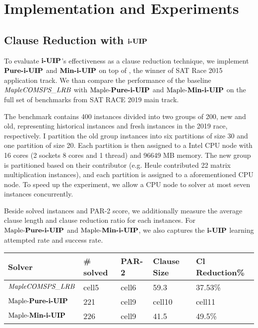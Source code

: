 \section{Implementation and Experiments}

\subsection{Clause Reduction with $\textbf{i-UIP}$}
To evaluate $\textbf{i-UIP}$'s effectiveness as a clause reduction technique, we implement  $\textbf{Pure-i-UIP}$ and $\textbf{Min-i-UIP}$  on top of \text{\MapleBase} \cite{}, the winner of SAT Race 2015 application track.  We than compare the performance of the baseline $\textit{MapleCOMSPS\_LRB}$ with $\text{Maple-\textbf{Pure-i-UIP}}$ and $\text{Maple-\textbf{Min-i-UIP}}$ on the full set of benchmarks from SAT RACE 2019 main track.

The benchmark contains 400 instances divided into two groups of 200, new and old, representing historical instances and fresh instances in the 2019 race, respectively. I partition the old group instances into six partitions of size 30 and one partition of size 20. Each partition is then assigned to a Intel CPU node with 16 cores (2 sockets 8 cores  and  1 thread) and 96649 MB memory. The new group is partitioned based on their contributor (e.g. Heule contributed 22 matrix multiplication instances), and each partition is assigned to a aforementioned CPU node. To speed up the experiment, we allow a CPU node to solver at most seven instances concurrently. 

Beside solved instances and PAR-2 score, we additionally measure the average clause length and clause reduction ratio for each instances. For $\text{Maple-\textbf{Pure-i-UIP}}$  and $\text{Maple-\textbf{Min-i-UIP}}$, we also captures the $\textbf{i-UIP}$ learning attempted rate and success rate.





\begin{center}
\begin{tabular}{ | m{3.5cm} | m{2cm}| m{2cm} | m{2cm} | m{2.5cm} | } 
\hline
Solver & \# solved & PAR-2 & Clause Size & Cl Reduction\% \\ 
\hline
$\textit{MapleCOMSPS\_LRB}$ & cell5 & cell6 & 59.3 & 37.53\% \\ 
\hline
$\text{Maple-\textbf{Pure-i-UIP}}$ & 221 & cell9 & cell10 & cell11\\ 
\hline
$\text{Maple-\textbf{Min-i-UIP}}$ & 226 & cell9 & 41.5 & 49.5\%\\ 
\hline
\end{tabular}
\end{center}

